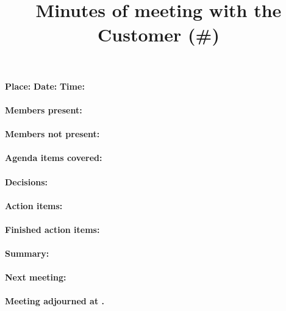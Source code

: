 \documentclass[paper=a4, fontsize=11pt]{article} %
\title{
\horrule{0.5pt} \\[0.4cm] %
\huge Minutes of meeting with the Customer (\#\meetingNumber)
\horrule{2pt} \\[-0.9cm] %
}
\newcounter{foocounter}
\begin{document}
\date{}
\maketitle %

\textbf{Place:} \meetingPlace
\textbf{Date:}  \meetingDate
\textbf{Time:}  \meetingTime
\paragraph{Members present:} \membersPresent
\paragraph{Members not present:} \membersMissing
\paragraph{Agenda items covered:} \hspace{0pt}
\setcounter{foocounter}{0}

\paragraph{Decisions:} \hspace{0pt}
\setcounter{foocounter}{0}

\paragraph{Action items:} \hspace{0pt}
\setcounter{foocounter}{0}

\paragraph{Finished action items:} \hspace{0pt}
\setcounter{foocounter}{0}

\paragraph{Summary:} \summary

\paragraph{Next meeting:} \nextMeeting

\paragraph{Meeting adjourned at \meetingEnd.}
\end{document}
